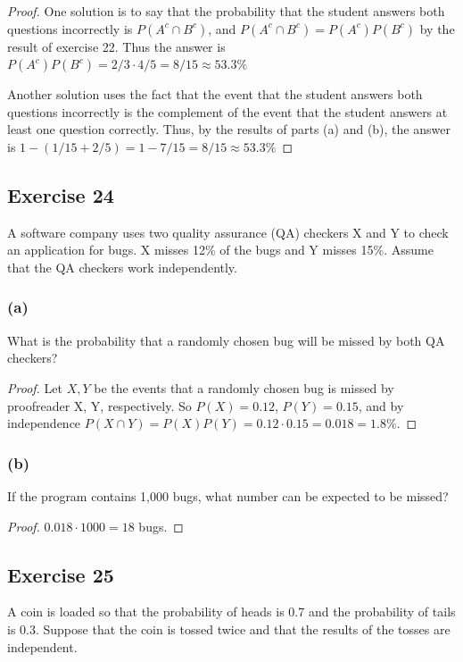 \documentclass[14pt]{extarticle}
\begin{document}
\begin{proof}
One solution is to say that the probability that the student answers both questions incorrectly is \(P(A^c \cap B^c)\), and 
\(P(A^c \cap B^c) = P(A^c)P(B^c)\) by the result of exercise 22. Thus the answer is \(P(A^c)P(B^c) = 2/3 \cdot 4/5 = 8/15 
\approx 53.3\%\)

Another solution uses the fact that the event that the student answers both questions incorrectly is the complement of the 
event that the student answers at least one question correctly. Thus, by the results of parts (a) and (b), the 
answer is \(1-(1/15+2/5) = 1-7/15 = 8/15 \approx 53.3\%\)
\end{proof}

\subsection{Exercise 24}
A software company uses two quality assurance (QA) checkers X and Y to check an application for bugs. X misses 12\% of the bugs and Y misses 15\%. Assume that the QA checkers work independently.

\subsubsection{(a)}
What is the probability that a randomly chosen bug will be missed by both QA checkers?

\begin{proof}
Let \(X, Y\) be the events that a randomly chosen bug is missed by proofreader X, Y, respectively. So \(P(X) = 0.12\),
\(P(Y) = 0.15\), and by independence \(P(X \cap Y) = P(X)P(Y) = 0.12 \cdot 0.15 = 0.018 = 1.8\%\).
\end{proof}

\subsubsection{(b)}
If the program contains 1,000 bugs, what number can be expected to be missed?

\begin{proof}
\(0.018 \cdot 1000 = 18\) bugs.
\end{proof}

\subsection{Exercise 25}
A coin is loaded so that the probability of heads is 0.7 and the probability of tails is 0.3. Suppose that the coin is 
tossed twice and that the results of the tosses are independent.
\end{document}
